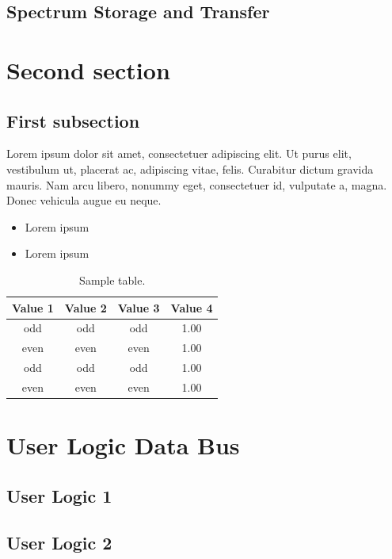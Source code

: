 \documentclass[12pt]{article}
\begin{document}
\subsection{Spectrum Storage and Transfer}
\section{Second section}

\fullboxbegin
\lipsum[1]
\fullboxend

\lipsum[1]

\subsection{First subsection}
\lipsum[1]

\leftboxbegin
Lorem ipsum dolor sit amet, consectetuer adipiscing elit. Ut purus elit, vestibulum ut, placerat ac, adipiscing vitae, felis. Curabitur dictum gravida mauris. Nam arcu libero, nonummy eget, consectetuer id, vulputate a, magna. Donec vehicula augue eu neque.
\leftboxend

\lipsum[1-2]

\rightboxbegin
\begin{itemize}
	\item Lorem ipsum
	\item Lorem ipsum
\end{itemize}
\rightboxend
\lipsum[1]
\begin{table}[!h]
	\centering
	\caption{Sample table.}
	\begin{tabular}{cccc}
		\toprule
		Value 1 & Value 2 & Value 3 & Value 4 \\
		\midrule
		odd     & odd     & odd     & 1.00    \\
		even    & even    & even    & 1.00    \\
		odd     & odd     & odd     & 1.00    \\
		even    & even    & even    & 1.00    \\
		\bottomrule
	\end{tabular}
\end{table}

\lipsum[1]

\lipsum[1]
\frameboxend

\appendix
\section{User Logic Data Bus}\label{appendix:user_logic}
\subsection{User Logic 1}\label{appendix:user_logic_1}
\lipsum[1]
\subsection{User Logic 2}\label{appendix:user_logic_2}
\lipsum[1]
\end{document}
